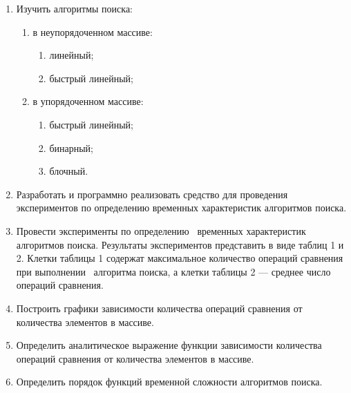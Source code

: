 \documentclass[12pt]{article}
\begin{document}
	\begin{enumerate}
	
	\item Изучить алгоритмы поиска:
	
		\begin{enumerate}
	
			\item в неупорядоченном массиве:
			
			\begin{enumerate}
	
				\item линейный;
	
				\item быстрый линейный;
			
			\end{enumerate}
	
	
			\item в упорядоченном массиве:
			
			\begin{enumerate}
	
				\item быстрый линейный;
	
				\item бинарный;
	
				\item блочный.
				
			\end{enumerate}
	
		\end{enumerate}
	
	\item Разработать и программно реализовать средство для проведения экспериментов по определению временных характеристик алгоритмов поиска.
	
	\item Провести эксперименты по определению  временных характеристик алгоритмов поиска. Результаты экспериментов представить в виде таблиц 1 и 2. Клетки таблицы 1 содержат максимальное количество операций сравнения при выполнении  алгоритма поиска, а клетки таблицы 2 — среднее число операций сравнения.
	
	\item Построить графики зависимости количества операций сравнения от количества элементов в массиве.
	
	\item Определить аналитическое выражение функции зависимости количества операций сравнения от количества элементов в массиве.
	
	\item Определить порядок функций временной сложности алгоритмов поиска.
	
	
	\end{enumerate}
	
\end{document}
